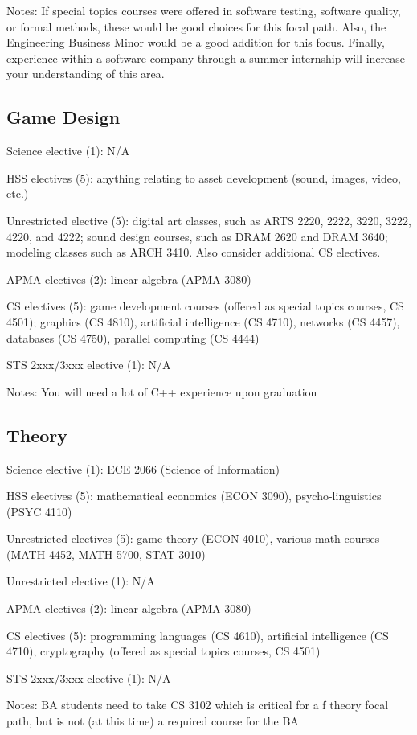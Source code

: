 Notes: If special topics courses were offered in software testing,
software quality, or formal methods, these would be good choices for
this focal path. Also, the Engineering Business Minor would be a good
addition for this focus. Finally, experience within a software company
through a summer internship will increase your understanding of this
area.


\subsection{Game Design}
\begin{itemlist}
\item Science elective (1): N/A
\item HSS electives (5): anything relating to asset development
  (sound, images, video, etc.)
\item Unrestricted elective (5): digital art classes, such as ARTS
  2220, 2222, 3220, 3222, 4220, and 4222; sound design courses, such
  as DRAM 2620 and DRAM 3640; modeling classes such as ARCH 3410.
  Also consider additional CS electives.
\item APMA electives (2): linear algebra (APMA 3080)
\item CS electives (5): game development courses (offered as special
  topics courses, CS 4501); graphics (CS 4810), artificial
  intelligence (CS 4710), networks (CS 4457), databases (CS 4750),
  parallel computing (CS 4444)
\item STS 2xxx/3xxx elective (1): N/A
\item Notes: You will need a lot of C++ experience upon graduation
\end{itemlist}

\subsection{Theory}
\begin{itemlist}
\item Science elective (1): ECE 2066 (Science of Information)
\item HSS electives (5): mathematical economics (ECON 3090),
  psycho-linguistics (PSYC 4110)
\item Unrestricted electives (5): game theory (ECON 4010), various math
  courses (MATH 4452, MATH 5700, STAT 3010)
\item Unrestricted elective (1): N/A
\item APMA electives (2): linear algebra (APMA 3080)
\item CS electives (5): programming languages (CS 4610), artificial
  intelligence (CS 4710), cryptography (offered as special topics
  courses, CS 4501)
\item STS 2xxx/3xxx elective (1): N/A
\item Notes: BA students need to take CS 3102 which is critical for a
f  theory focal path, but is not (at this time) a required course for
  the BA
\end{itemlist}


